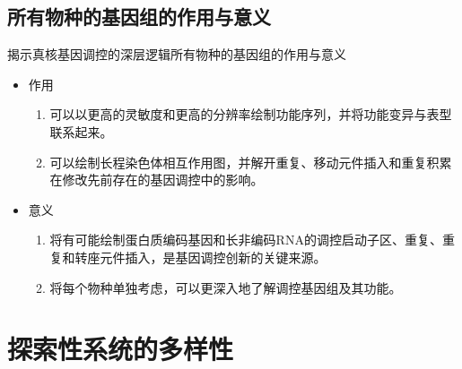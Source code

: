 \documentclass{beamer}
\begin{document}
	\subsection*{所有物种的基因组的作用与意义}
	\begin{frame}{揭示真核基因调控的深层逻辑}{所有物种的基因组的作用与意义}
		\begin{itemize}
			\item 作用
			\begin{enumerate}
				\item 可以以更高的灵敏度和更高的分辨率绘制功能序列，并将功能变异与表型联系起来。
				\item 可以绘制长程染色体相互作用图，并解开重复、移动元件插入和重复积累在修改先前存在的基因调控中的影响。
			\end{enumerate}

			\quad

			\item 意义
			\begin{enumerate}
				\item 将有可能绘制蛋白质编码基因和长非编码RNA的调控启动子区、重复、重复和转座元件插入，是基因调控创新的关键来源。
				\item 将每个物种单独考虑，可以更深入地了解调控基因组及其功能。
			\end{enumerate}
		\end{itemize}
	\end{frame}


	\section{探索性系统的多样性}
\end{document}

